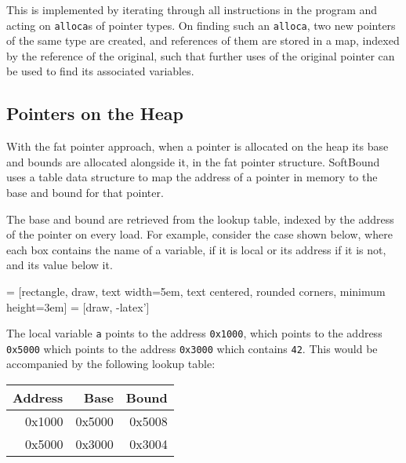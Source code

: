 This is implemented by iterating through all instructions in the program and acting on \verb!alloca!s of pointer types.
On finding such an \verb!alloca!, two new pointers of the same type are created, and references of them are stored in a map, indexed by the reference of the original, such that further uses of the original pointer can be used to find its associated variables.

\subsection{Pointers on the Heap}

With the fat pointer approach, when a pointer is allocated on the heap its base and bounds are allocated alongside it, in the fat pointer structure.
SoftBound uses a table data structure to map the address of a pointer in memory to the base and bound for that pointer.

The base and bound are retrieved from the lookup table, indexed by the address of the pointer on every load.
For example, consider the case shown below, where each box contains the name of a variable, if it is local or its address if it is not, and its value below it. 

\noindent
{} = [rectangle, draw, 
    text width=5em, text centered, rounded corners, minimum height=3em]
 = [draw, -latex']

The local variable \verb!a! points to the address \verb!0x1000!, which points to the address \verb!0x5000! which points to the address \verb!0x3000! which contains \verb!42!. This would be accompanied by the following lookup table:

\noindent
\begin{tabular}{|r|r|r|}
\hline Address & Base & Bound \\
\hline 0x1000 & 0x5000 & 0x5008 \\
\hline 0x5000 & 0x3000 & 0x3004 \\
\hline
\end{tabular}

